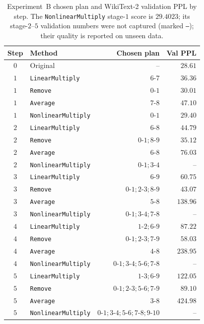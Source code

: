 \documentclass[10pt,a4paper]{article}
\newcommand{\removeop}{\texttt{Remove}}
\newcommand{\averageop}{\texttt{Average}}
\newcommand{\linop}{\texttt{LinearMultiply}}
\newcommand{\nlop}{\texttt{NonlinearMultiply}}
\begin{document}
\begin{table}[t]
\centering
\small
\begin{tabular}{clrr}
\toprule
Step & Method & Chosen plan & Val PPL \\
\midrule
$0$ & Original & -- & $28.61$ \\
\midrule
$1$ & \linop{}    & $6\text{-}7$ & $36.36$ \\
$1$ & \removeop{}            & $0\text{-}1$ & $30.01$ \\
$1$ & \averageop{}           & $7\text{-}8$ & $47.10$ \\
$1$ & \nlop{} & $0\text{-}1$ & $\mathbf{29.40}$ \\
\midrule
$2$ & \linop{}    & $6\text{-}8$ & $44.79$ \\
$2$ & \removeop{}            & $0\text{-}1;8\text{-}9$ & $35.12$ \\
$2$ & \averageop{}           & $6\text{-}8$ & $76.03$ \\
$2$ & \nlop{} & $0\text{-}1;3\text{-}4$ & -- \\
\midrule
$3$ & \linop{}    & $6\text{-}9$ & $60.75$ \\
$3$ & \removeop{}            & $0\text{-}1;2\text{-}3;8\text{-}9$ & $43.07$ \\
$3$ & \averageop{}           & $5\text{-}8$ & $138.96$ \\
$3$ & \nlop{} & $0\text{-}1;3\text{-}4;7\text{-}8$ & -- \\
\midrule
$4$ & \linop{}    & $1\text{-}2;6\text{-}9$ & $87.22$ \\
$4$ & \removeop{}            & $0\text{-}1;2\text{-}3;7\text{-}9$ & $58.03$ \\
$4$ & \averageop{}           & $4\text{-}8$ & $238.95$ \\
$4$ & \nlop{} & $0\text{-}1;3\text{-}4;5\text{-}6;7\text{-}8$ & -- \\
\midrule
$5$ & \linop{}    & $1\text{-}3;6\text{-}9$ & $122.05$ \\
$5$ & \removeop{}            & $0\text{-}1;2\text{-}3;5\text{-}6;7\text{-}9$ & $89.10$ \\
$5$ & \averageop{}           & $3\text{-}8$ & $424.98$ \\
$5$ & \nlop{} & $0\text{-}1;3\text{-}4;5\text{-}6;7\text{-}8;9\text{-}10$ & -- \\
\bottomrule
\end{tabular}
\caption{Experiment~B chosen plan and WikiText-2 validation PPL by step. The
\nlop{} stage-$1$ score is $29.4023$; its stage-$2$--$5$ validation numbers were
not captured (marked \texttt{--}); their quality is reported on unseen data.}
\label{tab:hiro-val}
\end{table}
\end{document}

